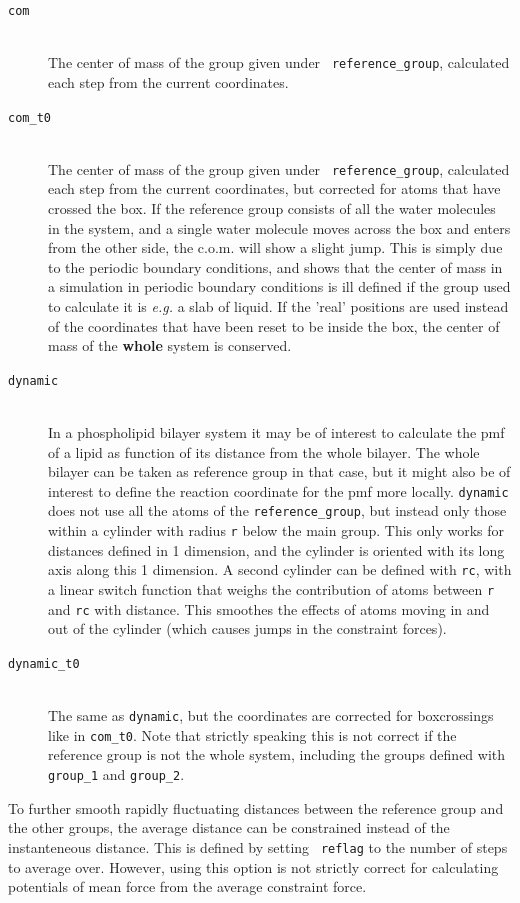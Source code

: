 \begin{description}
\item[\tt com]\mbox{}\\ The center of mass of the group given under {\tt
reference\_group}, calculated each step from the current coordinates. 
\item[\tt com\_t0]\mbox{}\\ The center of mass of the group given under {\tt
reference\_group}, calculated each step from the current coordinates,
but corrected for atoms that have crossed the box. If the reference
group consists of all the water molecules in the system, and a single
water molecule moves across the box and enters from the other side,
the c.o.m. will show a slight jump. This is simply due to the periodic
boundary conditions, and shows that the center of mass in a simulation
in periodic boundary conditions is ill defined if the group
used to calculate it is \emph{e.g.} a slab of liquid. If the 'real'
positions are used instead of the coordinates that have been reset to
be inside the box, the center of mass of the \textbf{whole} system is 
conserved. 
\item[\tt dynamic]\mbox{}\\ In a phospholipid bilayer system it may be of
interest to calculate the pmf of a lipid as function of its distance
from the whole bilayer. The whole bilayer can be taken as reference
group in that case, but it might also be of interest to define the
reaction coordinate for the pmf more locally. {\tt dynamic} does not
use all the atoms of the {\tt reference\_group}, but instead only those
within a cylinder with radius {\tt r} below the main group. This only
works for distances defined in 1 dimension, and the cylinder is
oriented with its long axis along this 1 dimension. A second cylinder
can be defined with {\tt rc}, with a linear switch function that weighs
the contribution of atoms between {\tt r} and {\tt rc} with
distance. This smoothes the effects of atoms moving in and out of the
cylinder (which causes jumps in the constraint forces). 
\item[\tt dynamic\_t0]\mbox{}\\
The same as {\tt dynamic}, but the coordinates are corrected for
boxcrossings like in {\tt com\_t0}. Note that strictly speaking this is
not correct if the reference group is not the whole system, including
the groups defined with {\tt group\_1} and {\tt group\_2}.
\end{description}

To further smooth rapidly fluctuating distances between the reference
group and the other groups, the average distance can be constrained
instead of the instanteneous distance. This is defined by setting {\tt
reflag} to the number of steps to average over. However, using this
option is not strictly correct for calculating potentials of mean
force from the average constraint force. 

